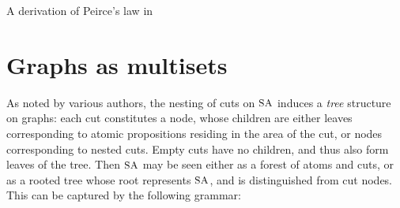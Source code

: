 \begin{marginfigure}
  
  \caption{A derivation of Peirce's law in }
\end{marginfigure}



\section{Graphs as multisets}

As noted by various authors, the nesting of cuts on $\small\textsc{SA}$ induces a
\emph{tree} structure on graphs: each cut constitutes a node, whose children are
either leaves corresponding to atomic propositions residing in the area of the
cut, or nodes corresponding to nested cuts. Empty cuts have no children, and
thus also form leaves of the tree. Then $\small\textsc{SA}$ may be seen either as a forest of
atoms and cuts, or as a rooted tree whose root represents $\small\textsc{SA}$, and is
distinguished from cut nodes. This can be captured by the following grammar:

